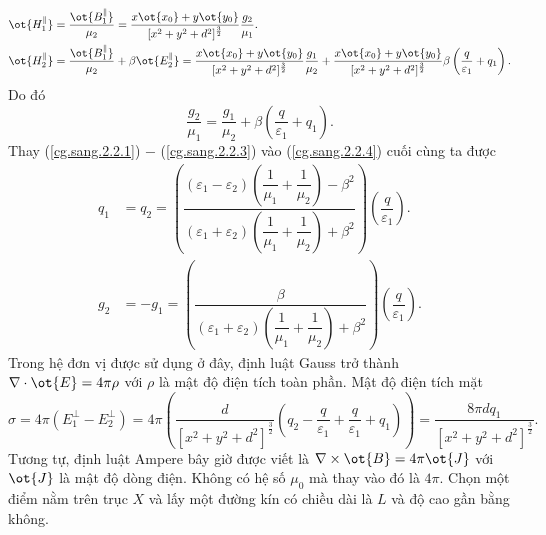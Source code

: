 \begin{loigiai}
\begin{enumerate}[1)]
\begin{enumerate}[a)]
\begin{align*}
            \ot{H_1^{\parallel}}&=\dfrac{\ot{B_1^{\parallel}}}{\mu_2}=\dfrac{x\ot{x_0}+y\ot{y_0}}{[x^2+y^2+d^2]^{\frac{3}{2}}}\dfrac{g_2}{\mu_1}.\\
            \ot{H_2^{\parallel}}&=\dfrac{\ot{B_1^{\parallel}}}{\mu_2}+\beta\ot{E_2^{\parallel}}=\dfrac{x\ot{x_0}+y\ot{y_0}}{[x^2+y^2+d^2]^{\frac{3}{2}}}\dfrac{g_1}{\mu_2}+\dfrac{x\ot{x_0}+y\ot{y_0}}{[x^2+y^2+d^2]^{\frac{3}{2}}}\beta\left(\dfrac{q}{\varepsilon_1}+q_1\right).
        \end{align*}
        Do đó 
        \[\dfrac{g_2}{\mu_1}=\dfrac{g_1}{\mu_2}+\beta\left(\dfrac{q}{\varepsilon_1}+q_1\right). \tag{4} \label{cg.sang.2.2.4}\]
        Thay (\ref{cg.sang.2.2.1}) $-$ (\ref{cg.sang.2.2.3}) vào (\ref{cg.sang.2.2.4}) cuối cùng ta được
        \begin{align*}
            q_1 &= q_2 = \left(\dfrac{(\varepsilon_1 - \varepsilon_2) \left(\dfrac{1}{\mu_1} + \dfrac{1}{\mu_2}\right) -\beta^2}{(\varepsilon_1+\varepsilon_2)\left(\dfrac{1}{\mu_1}+\dfrac{1}{\mu_2}\right)+\beta^2}\right)\left(\dfrac{q}{\varepsilon_1}\right).\\
            g_2 &= -g_1 = \left(\dfrac{\beta}{(\varepsilon_1+\varepsilon_2)\left(\dfrac{1}{\mu_1}+\dfrac{1}{\mu_2}\right)+\beta^2}\right)\left(\dfrac{q}{\varepsilon_1}\right).
        \end{align*}
        Trong hệ đơn vị được sử dụng ở đây, định luật Gauss trở thành $ \nabla\cdot\ot{E}=4\pi\rho$ với $\rho$ là mật độ điện tích toàn phần.
        Mật độ điện tích mặt
        \[\sigma=4\pi(E_1^{\bot}-E_2^{\bot})=4\pi\left(\dfrac{d}{[x^2+y^2+d^2]^{\frac{3}{2}}}\left(q_2-\dfrac{q}{\varepsilon_1}+\dfrac{q}{\varepsilon_1}+q_1\right)\right)=\dfrac{8\pi dq_1}{[x^2+y^2+d^2]^{\frac{3}{2}}}.\]
        Tương tự, định luật Ampere bây giờ được viết là  $\nabla\times\ot{B}=4\pi\ot{J}$ với $\ot{J}$ là mật độ dòng điện. Không có hệ số $\mu_0$ mà thay vào đó là $4\pi$. Chọn một điểm nằm trên trục $X$ và lấy một đường kín có chiều dài là $L$ và độ cao gần bằng không.
        \begin{center}
            


\begin{tikzpicture}[x=0.75pt,y=0.75pt,yscale=-1,xscale=1]


\end{tikzpicture}
\end{center}
\end{enumerate}
\end{enumerate}
\end{loigiai}
